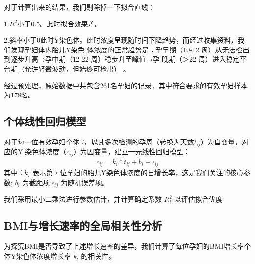 \documentclass{article}
\begin{document}
对于计算出来的结果，我们剔除掉一下拟合直线：

1.$R^2$小于0.5。此时拟合效果差。

2.斜率小于0此时Y染色体。此时浓度呈现随时间下降趋势，而经过收集资料，我们发现孕妇体内胎儿Y染色
体浓度的正常趋势是：孕早期（10-12 周）从无法检出到逐步升高→孕中期（12-22 周）稳步升至峰值→孕
晚期（＞22 周）进入稳定平台期（允许轻微波动，但始终可检出） 。

经过预处理，原始数据中共包含261名孕妇的记录，其中符合要求的有效孕妇样本为178名。
\subsection{个体线性回归模型}
对于每一位有效孕妇个体 $i$，以其多次检测的孕周（转换为天数$t_{ij}$）为自变量，对应的Y
染色体浓度（$c_{ij}$）为因变量，建立一元线性回归模型：
\begin{gather}
    c_{ij}=k_i*t_{ij}+b_i+\epsilon_{ij} \tag{1}
\end{gather}
其中：$k_i$ 表示第 $i$ 位孕妇的胎儿Y染色体浓度的日增长率，这是我们关注的核心参数;
$b_i$ 为截距项;$\epsilon_{ij}$ 为随机误差项。

我们采用最小二乘法进行参数估计，并计算确定系数 $R^2_i$ 以评估拟合优度

\subsection{BMI与增长速率的全局相关性分析}
为探究BMI是否导致了上述增长速率的差异，我们计算了每位孕妇的BMI增长率个体Y染色体浓度增长率 $k_i$ 的相关性。
\end{document}
